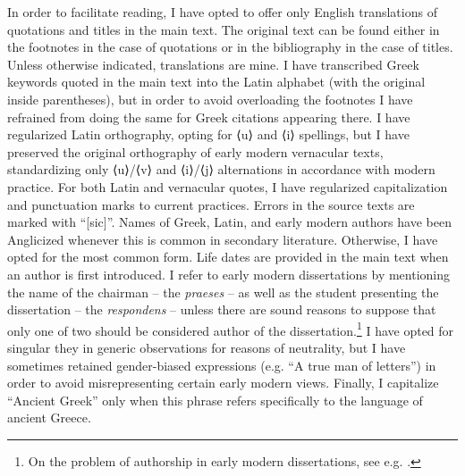 \hypertarget{Toc19704800}{}
In order to facilitate reading, I have opted to offer only English translations of quotations and titles in the main text. The original text can be found either in the footnotes in the case of quotations or in the bibliography in the case of titles. Unless otherwise indicated, translations are mine. I have transcribed Greek keywords quoted in the main text into the Latin alphabet (with the original inside parentheses), but in order to avoid overloading the footnotes I have refrained from doing the same for Greek citations appearing there. I have regularized Latin orthography, opting for ⟨u⟩ and ⟨i⟩ spellings, but I have preserved the original orthography of early modern vernacular texts, standardizing only ⟨u⟩/⟨v⟩ and ⟨i⟩/⟨j⟩ alternations in accordance with modern practice. For both Latin and vernacular quotes, I have regularized capitalization and punctuation marks to current practices. Errors in the source texts are marked with “[sic]”. Names of Greek, Latin, and early modern authors have been Anglicized whenever this is common in secondary literature. Otherwise, I have opted for the most common form. Life dates are provided in the main text when an author is first introduced. I refer to early modern dissertations by mentioning the name of the chairman – the \textit{praeses} – as well as the student presenting the dissertation – the \textit{respondens} – unless there are sound reasons to suppose that only one of two should be considered author of the dissertation.\footnote{On the problem of authorship in early modern dissertations, see e.g. \citet{Considine2008b}.} I have opted for singular they in generic observations for reasons of neutrality, but I have sometimes retained gender-biased expressions (e.g. “A true man of letters”) in order to avoid misrepresenting certain early modern views. Finally, I capitalize “Ancient Greek” only when this phrase refers specifically to the language of ancient Greece.
